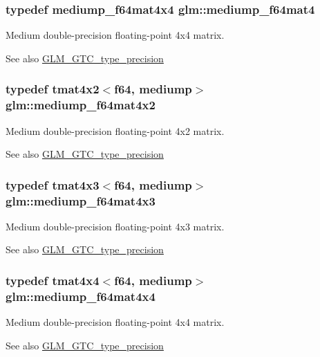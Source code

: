 \subsubsection[{mediump\+\_\+f64mat4}]{\setlength{\rightskip}{0pt plus 5cm}typedef {\bf mediump\+\_\+f64mat4x4} {\bf glm\+::mediump\+\_\+f64mat4}}\label{namespaceglm_a2763f655bfe2141a014e66d26a9d2f18}
Medium double-\/precision floating-\/point 4x4 matrix. \begin{DoxySeeAlso}{See also}
\hyperlink{group__gtc__type__precision}{G\+L\+M\+\_\+\+G\+T\+C\+\_\+type\+\_\+precision} 
\end{DoxySeeAlso}
\hypertarget{namespaceglm_ac6276267e7175f213a268d67af678713}{}
\subsubsection[{mediump\+\_\+f64mat4x2}]{\setlength{\rightskip}{0pt plus 5cm}typedef tmat4x2$<${\bf f64}, mediump$>$ {\bf glm\+::mediump\+\_\+f64mat4x2}}\label{namespaceglm_ac6276267e7175f213a268d67af678713}
Medium double-\/precision floating-\/point 4x2 matrix. \begin{DoxySeeAlso}{See also}
\hyperlink{group__gtc__type__precision}{G\+L\+M\+\_\+\+G\+T\+C\+\_\+type\+\_\+precision} 
\end{DoxySeeAlso}
\hypertarget{namespaceglm_ae6d05f1ef3c0af1285a298ed1a57cec3}{}
\subsubsection[{mediump\+\_\+f64mat4x3}]{\setlength{\rightskip}{0pt plus 5cm}typedef tmat4x3$<${\bf f64}, mediump$>$ {\bf glm\+::mediump\+\_\+f64mat4x3}}\label{namespaceglm_ae6d05f1ef3c0af1285a298ed1a57cec3}
Medium double-\/precision floating-\/point 4x3 matrix. \begin{DoxySeeAlso}{See also}
\hyperlink{group__gtc__type__precision}{G\+L\+M\+\_\+\+G\+T\+C\+\_\+type\+\_\+precision} 
\end{DoxySeeAlso}
\hypertarget{namespaceglm_a16db659f891a49e36f057fa38e1b7524}{}
\subsubsection[{mediump\+\_\+f64mat4x4}]{\setlength{\rightskip}{0pt plus 5cm}typedef tmat4x4$<${\bf f64}, mediump$>$ {\bf glm\+::mediump\+\_\+f64mat4x4}}\label{namespaceglm_a16db659f891a49e36f057fa38e1b7524}
Medium double-\/precision floating-\/point 4x4 matrix. \begin{DoxySeeAlso}{See also}
\hyperlink{group__gtc__type__precision}{G\+L\+M\+\_\+\+G\+T\+C\+\_\+type\+\_\+precision} 
\end{DoxySeeAlso}
\hypertarget{namespaceglm_a9b1e5792ab8cc6a732cae5bd7a9328ec}{}
